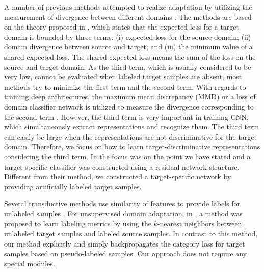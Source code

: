 \documentclass{article}
\begin{document}
A number of previous methods attempted to realize adaptation by utilizing the measurement of divergence between different domains \cite{ganin2014unsupervised,long2015learning,li2016revisiting}.
The methods are based on the theory proposed in \cite{ben2010theory}, which states that the expected loss for a target domain is bounded by three terms: (i) expected loss for the source domain; (ii) domain divergence between source and target; and (iii) the minimum value of a shared expected loss. The shared expected loss means the sum of the loss on the source and target domain. 
As the third term, which is usually considered to be very low, cannot be evaluated when labeled target samples are absent, most methods try to minimize the first term and the second term. With regards to training deep architectures, the maximum mean discrepancy (MMD) or a loss of domain classifier network is utilized to measure the divergence corresponding to the second term \cite{gretton2012kernel,ganin2014unsupervised,long2015learning,long2016unsupervised,bousmalis2016domain}.
However, the third term is very important in training CNN, which simultaneously extract representations and recognize them. The third term can easily be large when the representations are not discriminative for the target domain. Therefore, we focus on how to learn target-discriminative representations considering the third term. In
\cite{long2016unsupervised} the focus was on the point we have stated and a target-specific classifier was constructed using a residual network structure. Different from their method, we constructed a target-specific network by providing artificially labeled target samples.

Several transductive methods use similarity of features to provide labels for unlabeled samples \cite{rohrbach2013transfer,khamis2014coconut}. For unsupervised domain adaptation, in \cite{sener2016learning}, a method was proposed to learn labeling metrics by using the $k$-nearest neighbors between unlabeled target samples and labeled source samples. In contrast to this method, our method explicitly and simply backpropagates the category loss for target samples based on pseudo-labeled samples. Our approach does not require any special modules.
\end{document}
